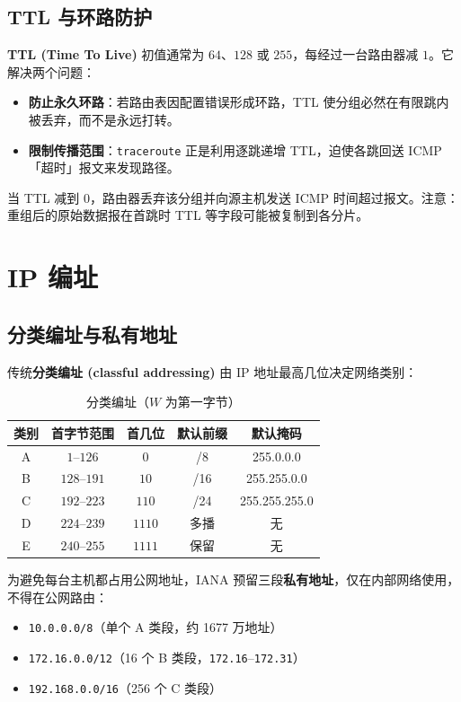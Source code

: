 \subsection{TTL 与环路防护}

\textbf{TTL (Time To Live)} 初值通常为 $64$、$128$ 或 $255$，每经过一台路由器减 $1$。它解决两个问题：

\begin{itemize}
    \item \textbf{防止永久环路}：若路由表因配置错误形成环路，TTL 使分组必然在有限跳内被丢弃，而不是永远打转。
    \item \textbf{限制传播范围}：\texttt{traceroute} 正是利用逐跳递增 TTL，迫使各跳回送 ICMP「超时」报文来发现路径。
\end{itemize}

当 TTL 减到 $0$，路由器丢弃该分组并向源主机发送 ICMP 时间超过报文。注意：重组后的原始数据报在首跳时 TTL 等字段可能被复制到各分片。

\section{IP 编址}

\subsection{分类编址与私有地址}

传统\textbf{分类编址 (classful addressing)} 由 IP 地址最高几位决定网络类别：

\begin{table}[H]
\centering
\caption{分类编址（$W$ 为第一字节）}
\begin{tabulary}{\textwidth}{CCCCC}
\toprule
类别 & 首字节范围 & 首几位 & 默认前缀 & 默认掩码 \\
\midrule
A & $1$--$126$ & $0$ & /8 & 255.0.0.0 \\
B & $128$--$191$ & $10$ & /16 & 255.255.0.0 \\
C & $192$--$223$ & $110$ & /24 & 255.255.255.0 \\
D & $224$--$239$ & $1110$ & 多播 & 无 \\
E & $240$--$255$ & $1111$ & 保留 & 无 \\
\bottomrule
\end{tabulary}
\end{table}

为避免每台主机都占用公网地址，IANA 预留三段\textbf{私有地址}，仅在内部网络使用，不得在公网路由：

\begin{itemize}
    \item \texttt{10.0.0.0/8}（单个 A 类段，约 1677 万地址）
    \item \texttt{172.16.0.0/12}（16 个 B 类段，\texttt{172.16}--\texttt{172.31}）
    \item \texttt{192.168.0.0/16}（256 个 C 类段）
\end{itemize}

